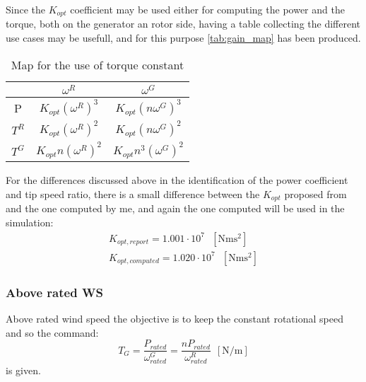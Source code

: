 Since the $K_{opt}$ coefficient may be used either for computing the power and the torque, both on the generator an rotor side, having a table collecting the different use cases may be usefull, and for this purpose \autoref{tab:gain_map} has been produced.
\begin{table}[htb]
    \centering
    \caption{Map for the use of torque constant}
    \begin{tabular}{ccc}
    \toprule
         & $\omega^R$ & $\omega^G$  \\ \midrule
         P & $K_{opt} \left(\omega^{R}\right)^3$ & $K_{opt}\left(n \omega^{G}\right)^3$\\
         $T^R$ & $K_{opt} \left( \omega^{R}\right)^2$ & $K_{opt}\left(n \omega^{G}\right)^2$\\
         $T^G$ & $K_{opt} n \left(\omega^{R}\right)^2$ &  $K_{opt} n^3\left(\omega^{G}\right)^2$\\ \bottomrule
    \end{tabular}
    \label{tab:gain_map}
\end{table}

 For the differences discussed above in the identification of the power coefficient and tip speed ratio, there is a small difference between the $K_{opt}$ proposed from \cite{DTU_Wind_Energy_Report-I-0092} and the one computed by me, and again the one computed will be used in the simulation:
 \begin{gather*}
     K_{opt, report} = 1.001 \cdot 10^7 \ \ \ \left[\si{\newton\meter\square\second}\right] \\
     K_{opt, computed} = 1.020 \cdot 10^7 \ \ \ \left[\si{\newton\meter\square\second}\right] 
 \end{gather*}

\subsubsection{Above rated \acrshort{WS}}
Above rated wind speed the objective is to keep the constant rotational speed and so the command:
\begin{equation}
    T_G = \frac{P_{rated}}{\omega_{rated}^G} = \frac{nP_{rated}}{\omega_{rated}^R}\ \ \left[\si{\newton\per\meter}\right]
    \label{eq:T_G3}
\end{equation}
is given.

